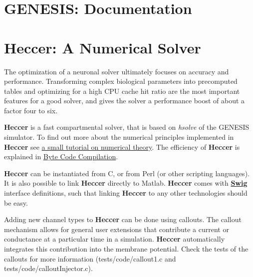 \documentclass[12pt]{article}
\begin{document}
\section*{GENESIS: Documentation}

\section*{Heccer: A Numerical Solver}

%

%

The optimization of a neuronal solver ultimately focuses on accuracy and performance. Transforming complex biological parameters into precomputed tables and optimizing for a high CPU cache hit ratio are the most important features for a good solver, and gives the solver a performance boost of about a factor four to six.

{\bf Heccer} is a fast compartmental solver, that is based on {\it hsolve} of the GENESIS simulator. To find out more about the numerical principles implemented in {\bf Heccer} see \href{http://www.genesis-sim.org/GENESIS/gum-tutorials/cornelis/doc/html/node3.html}{a small tutorial on numerical theory}. The efficiency of {\bf Heccer} is explained in \href{http://www.genesis-sim.org/GENESIS/gum-tutorials/cornelis/doc/html/node53.html}{Byte Code Compilation}.

{\bf Heccer} can be instantiated from C, or from Perl (or other scripting languages). It is also possible to link {\bf Heccer} directly to Matlab. {\bf Heccer} comes with \href{http://www.swig.org/}{\bf Swig} interface definitions, such that linking {\bf Heccer} to any other technologies should be easy.

Adding new channel types to {\bf Heccer} can be done using callouts.
The callout mechanism allows for general user extensions that
contribute a current or conductance at a particular time in a
simulation. {\bf Heccer} automatically integrates this contribution
into the membrane potential.  Check the tests of the callouts for more
information (tests/code/callout1.c and tests/code/calloutInjector.c).
\end{document}

